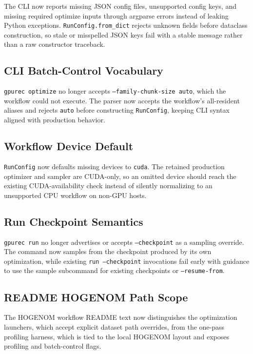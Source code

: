 \documentclass[11pt]{article}
\begin{document}
The CLI now reports missing JSON config files, unsupported config keys, and
missing required optimize inputs through argparse errors instead of leaking
Python exceptions.  \texttt{RunConfig.from\_dict} rejects unknown fields before
dataclass construction, so stale or misspelled JSON keys fail with a stable
message rather than a raw constructor traceback.

\subsection{CLI Batch-Control Vocabulary}

\texttt{gpurec optimize} no longer accepts \texttt{--family-chunk-size auto},
which the workflow could not execute.  The parser now accepts the workflow's
all-resident aliases and rejects \texttt{auto} before constructing
\texttt{RunConfig}, keeping CLI syntax aligned with production behavior.

\subsection{Workflow Device Default}

\texttt{RunConfig} now defaults missing devices to \texttt{cuda}.  The retained
production optimizer and sampler are CUDA-only, so an omitted device should
reach the existing CUDA-availability check instead of silently normalizing to an
unsupported CPU workflow on non-GPU hosts.

\subsection{Run Checkpoint Semantics}

\texttt{gpurec run} no longer advertises or accepts \texttt{--checkpoint} as a
sampling override.  The command now samples from the checkpoint produced by its
own optimization, while existing \texttt{run --checkpoint} invocations fail
early with guidance to use the sample subcommand for existing checkpoints or
\texttt{--resume-from}.

\subsection{README HOGENOM Path Scope}

The HOGENOM workflow README text now distinguishes the optimization launchers,
which accept explicit dataset path overrides, from the one-pass profiling
harness, which is tied to the local HOGENOM layout and exposes profiling and
batch-control flags.
\end{document}
